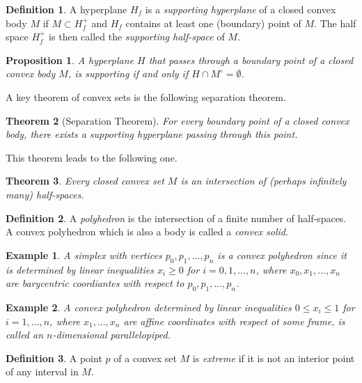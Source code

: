\documentclass{article}
\newtheorem{theorem}{Theorem}[section]
\newtheorem{proposition}[theorem]{Proposition}
\newtheorem{example}{Example}[section]
\theoremstyle{remark}
\theoremstyle{definition}
\newtheorem{definition}{Definition}[section]
\begin{document}
\begin{definition}
A hyperplane $H_f$ is a \textit{supporting hyperplane} of a closed convex body $M$ if $M \subset H^+_f$ and $H_f$ contains at least one (boundary) point of $M$. The half space $H^+_f$ is then called the \textit{supporting half-space} of $M$. 
\end{definition}

\begin{proposition}
A hyperplane $H$ that passes through a boundary point of a closed convex body $M$, is supporting if and only if $H \cap M^\circ = \emptyset$. 
\end{proposition}

A key theorem of convex sets is the following separation theorem. 

\begin{theorem}[Separation Theorem]
For every boundary point of a closed convex body, there exists a supporting hyperplane passing through this point. 
\end{theorem}

This theorem leads to the following one. 

\begin{theorem}
Every closed convex set $M$ is an intersection of (perhaps infinitely many) half-spaces. 
\end{theorem}

\begin{definition}
A \textit{polyhedron} is the intersection of a finite number of half-spaces. A convex polyhedron which is also a body is called a \textit{convex solid}. 
\end{definition}

\begin{example}
A simplex with vertices $p_0, p_1, ..., p_n$ is a convex polyhedron since it is determined by linear inequalities $x_i \geq 0$ for $i = 0, 1, ..., n$, where $x_0, x_1, ..., x_n$ are barycentric coordiantes with respect to $p_0, p_1,..., p_n$. 
\end{example}

\begin{example}
A convex polyhedron determined by linear inequalities $0 \leq x_i \leq 1$ for $i = 1, ..., n$, where $x_1,..., x_n$ are affine coordinates with respect ot some frame, is called an $n$-dimensional parallelopiped. 
\end{example}

\begin{definition}
A point $p$ of a convex set $M$ is \textit{extreme} if it is not an interior point of any interval in $M$. 
\end{definition}
\end{document}
